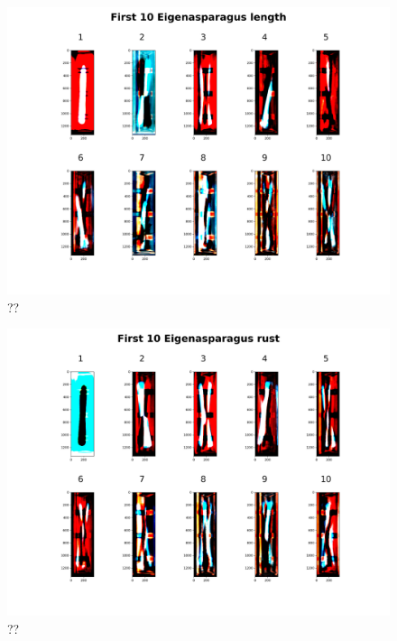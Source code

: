 \begin{figure}[H]
	\centering
	\includegraphics[scale=0.09]{Figures/chapter04/pc_length}
	\decoRule
	\caption[??]{??}
	\label{fig:PrincipalComponentLength}
\end{figure}


\begin{figure}[H]
	\centering
	\includegraphics[scale=0.09]{Figures/chapter04/pc_rust}
	\decoRule
	\caption[??]{??}
	\label{fig:PrincipalComponentRust}
\end{figure}


